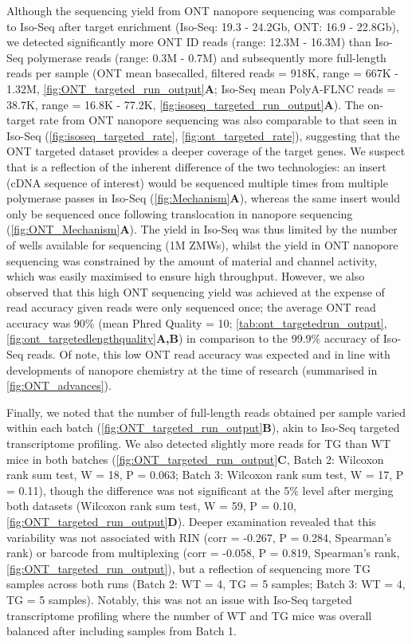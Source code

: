 \newpage
Although the sequencing yield from ONT nanopore sequencing was comparable to Iso-Seq after target enrichment (Iso-Seq: 19.3 - 24.2Gb, ONT: 16.9 - 22.8Gb), we detected significantly more ONT ID reads (range: 12.3M - 16.3M) than Iso-Seq polymerase reads (range: 0.3M - 0.7M) and subsequently more full-length reads per sample (ONT mean basecalled, filtered reads = 918K, range = 667K - 1.32M, \cref{fig:ONT_targeted_run_output}\textbf{A}; Iso-Seq mean PolyA-FLNC reads = 38.7K, range = 16.8K - 77.2K, \cref{fig:isoseq_targeted_run_output}\textbf{A}). The on-target rate from ONT nanopore sequencing was also comparable to that seen in Iso-Seq (\cref{fig:isoseq_targeted_rate}, \cref{fig:ont_targeted_rate}), suggesting that the ONT targeted dataset provides a deeper coverage of the target genes. We suspect that is a reflection of the inherent difference of the two technologies: an insert (cDNA sequence of interest) would be sequenced multiple times from multiple polymerase passes in Iso-Seq (\cref{fig:Mechanism}\textbf{A}), whereas the same insert would only be sequenced once following translocation in nanopore sequencing (\cref{fig:ONT_Mechanism}\textbf{A}). The yield in Iso-Seq was thus limited by the number of wells available for sequencing (1M ZMWs), whilst the yield in ONT nanopore sequencing was constrained by the amount of material and channel activity, which was easily maximised to ensure high throughput. However, we also observed that this high ONT sequencing yield was achieved at the expense of read accuracy given reads were only sequenced once; the average ONT read accuracy was 90\% (mean Phred Quality = 10; \cref{tab:ont_targetedrun_output}, \cref{fig:ont_targetedlengthquality}\textbf{A,B}) in comparison to the 99.9\% accuracy of Iso-Seq reads. Of note, this low ONT read accuracy was expected and in line with developments of nanopore chemistry at the time of research (summarised in \cref{fig:ONT_advances}).  

Finally, we noted that the number of full-length reads obtained per sample varied within each batch (\cref{fig:ONT_targeted_run_output}\textbf{B}), akin to Iso-Seq targeted transcriptome profiling. We also detected slightly more reads for TG than WT mice in both batches (\cref{fig:ONT_targeted_run_output}\textbf{C}, Batch 2: Wilcoxon rank sum test, W = 18, P = 0.063; Batch 3: Wilcoxon rank sum test, W = 17, P = 0.11), though the difference was not significant at the 5\% level after merging both datasets (Wilcoxon rank sum test, W = 59, P = 0.10, \cref{fig:ONT_targeted_run_output}\textbf{D}). Deeper examination revealed that this variability was not associated with RIN (corr = -0.267, P = 0.284, Spearman's rank) or barcode from multiplexing (corr = -0.058, P = 0.819, Spearman's rank, \cref{fig:ONT_targeted_run_output}), but a reflection of sequencing more TG samples across both runs (Batch 2: WT = 4, TG = 5 samples; Batch 3: WT = 4, TG = 5 samples). Notably, this was not an issue with Iso-Seq targeted transcriptome profiling where the number of WT and TG mice was overall balanced after including samples from Batch 1. %

